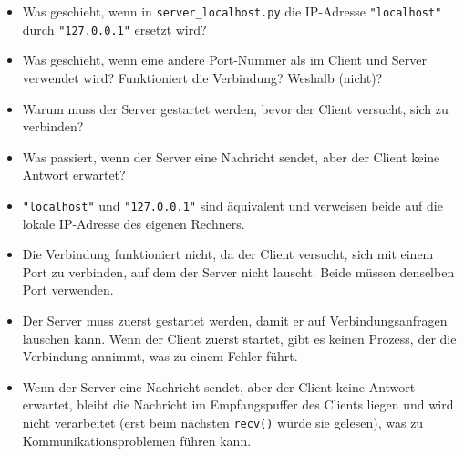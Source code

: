 \begin{myexercise}[Verständnisfragen]
    \begin{itemize}
        \item Was geschieht, wenn in \texttt{server\_localhost.py} die \gls{IP}-Adresse \lstinline|"localhost"| durch \lstinline|"127.0.0.1"| ersetzt wird?
        \item Was geschieht, wenn eine andere Port-Nummer als im Client und Server verwendet wird? Funktioniert die Verbindung? Weshalb (nicht)?
        \item Warum muss der Server gestartet werden, bevor der Client versucht, sich zu verbinden?
        \item Was passiert, wenn der Server eine Nachricht sendet, aber der Client keine Antwort erwartet?
    \end{itemize}
    \begin{myanswer}
        \begin{itemize}
            \item \lstinline|"localhost"| und \lstinline|"127.0.0.1"| sind äquivalent und verweisen beide auf die lokale \gls{IP}-Adresse des eigenen Rechners.
            \item Die Verbindung funktioniert nicht, da der Client versucht, sich mit einem Port zu verbinden, auf dem der Server nicht lauscht. Beide müssen denselben Port verwenden.
            \item Der Server muss zuerst gestartet werden, damit er auf Verbindungsanfragen lauschen kann. Wenn der Client zuerst startet, gibt es keinen Prozess, der die Verbindung annimmt, was zu einem Fehler führt.
            \item Wenn der Server eine Nachricht sendet, aber der Client keine Antwort erwartet, bleibt die Nachricht im Empfangspuffer des Clients liegen und wird nicht verarbeitet (erst beim nächsten \lstinline|recv()| würde sie gelesen), was zu Kommunikationsproblemen führen kann.
        \end{itemize}
    \end{myanswer}
\end{myexercise}


